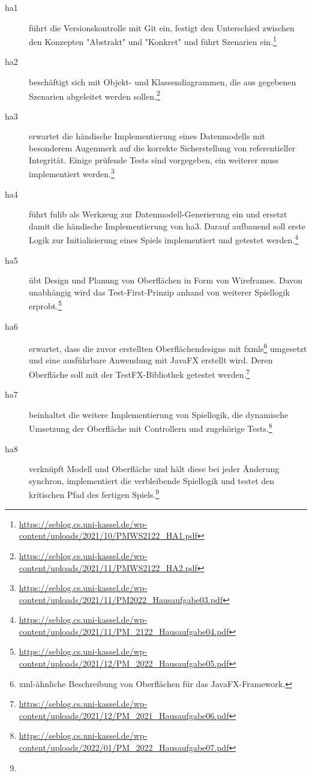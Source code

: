 \begin{description}
    \item[\ac{ha}1] führt die Versionskontrolle mit Git ein, festigt den Unterschied zwischen den Konzepten "Abstrakt" und "Konkret" und führt Szenarien ein.\footnote{
        \url{https://seblog.cs.uni-kassel.de/wp-content/uploads/2021/10/PMWS2122_HA1.pdf}
    }
    \item[\ac{ha}2] beschäftigt sich mit Objekt- und Klassendiagrammen, die aus gegebenen Szenarien abgeleitet werden sollen.\footnote{
        \url{https://seblog.cs.uni-kassel.de/wp-content/uploads/2021/11/PMWS2122_HA2.pdf}
    }
    \item[\ac{ha}3] erwartet die händische Implementierung eines Datenmodells mit besonderem Augenmerk auf die korrekte Sicherstellung von referentieller Integrität.
    Einige prüfende Tests sind vorgegeben, ein weiterer muss implementiert werden.\footnote{
        \url{https://seblog.cs.uni-kassel.de/wp-content/uploads/2021/11/PM2022_Hausaufgabe03.pdf}
    }
    \item[\ac{ha}4] führt fulib als Werkzeug zur Datenmodell-Generierung ein und ersetzt damit die händische Implementierung von \ac{ha}3.
    Darauf aufbauend soll erste Logik zur Initialisierung eines Spiels implementiert und getestet werden.\footnote{
        \url{https://seblog.cs.uni-kassel.de/wp-content/uploads/2021/11/PM_2122_Hausaufgabe04.pdf}
    }
    \item[\ac{ha}5] übt Design und Planung von Oberflächen in Form von Wireframes.
    Davon unabhängig wird das Test-First-Prinzip anhand von weiterer Spiellogik erprobt.\footnote{
        \url{https://seblog.cs.uni-kassel.de/wp-content/uploads/2021/12/PM_2022_Hausaufgabe05.pdf}
    }
    \item[\ac{ha}6] erwartet, dass die zuvor erstellten Oberflächendesigns mit \acp{fxml}\footnote{
        \ac{xml}-ähnliche Beschreibung von Oberflächen für das JavaFX-Framework.
    } umgesetzt und eine ausführbare Anwendung mit JavaFX erstellt wird.
    Deren Oberfläche soll mit der TestFX-Bibliothek getestet werden.\footnote{
        \url{https://seblog.cs.uni-kassel.de/wp-content/uploads/2021/12/PM_2021_Hausaufgabe06.pdf}
    }
    \item[\ac{ha}7] beinhaltet die weitere Implementierung von Spiellogik, die dynamische Umsetzung der Oberfläche mit Controllern und zugehörige Tests.\footnote{
        \url{https://seblog.cs.uni-kassel.de/wp-content/uploads/2022/01/PM_2022_Hausaufgabe07.pdf}
    }
    \item[\ac{ha}8] verknüpft Modell und Oberfläche und hält diese bei jeder Änderung synchron, implementiert die verbleibende Spiellogik und testet den kritischen Pfad des fertigen Spiels.\footnote{
}
\end{description}
